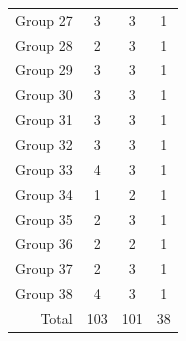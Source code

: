 \begin{table}[t]
\begin{tabular}{@{}rccc@{}}
        Group 27 & 3                                         & 3                                          & 1                                      \\
        Group 28 & 2                                         & 3                                          & 1                                      \\
        Group 29 & 3                                         & 3                                          & 1                                      \\
        Group 30 & 3                                         & 3                                          & 1                                      \\
        Group 31 & 3                                         & 3                                          & 1                                      \\
        Group 32 & 3                                         & 3                                          & 1                                      \\
        Group 33 & 4                                         & 3                                          & 1                                      \\
        Group 34 & 1                                         & 2                                          & 1                                      \\
        Group 35 & 2                                         & 3                                          & 1                                      \\
        Group 36 & 2                                         & 2                                          & 1                                      \\
        Group 37 & 2                                         & 3                                          & 1                                      \\
        Group 38 & 4                                         & 3                                          & 1                                      \\ \midrule
        Total    & 103                                       & 101                                        & 38                                     \\
        \bottomrule
    \end{tabular}
\end{table}



